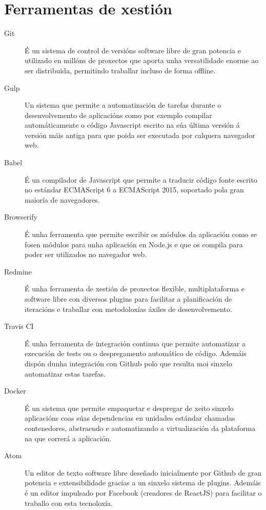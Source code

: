   \section{Ferramentas de xestión}

  \begin{description}
   \item [Git] É un sistema de control de versións software libre de gran 
potencia e 
utilizado en millóns de proxectos que aporta unha versatilidade enorme ao ser 
distribuida, permitindo traballar incluso de forma offline.
   \item [Gulp] Un sistema que permite a automatización de tarefas durante o 
desenvolvemento de aplicacións como por exemplo compilar automáticamente o código 
Javascript escrito na súa última versión á versión máis antiga para que poida ser 
executada por calquera navegador web.
    \item [Babel] É un compilador de Javascript que permite a traducir código 
fonte escrito no estándar ECMAScript 6 a ECMAScript 2015, soportado pola gran 
maioría de navegadores.
    \item [Browserify] É unha ferramenta que permite escribir os módulos da 
aplicación como se fosen módulos para unha aplicación en Node.js e que os 
compila para poder ser utilizados no navegador web. 
   \item [Redmine] É unha ferramenta de xestión de proxectos flexible, multiplataforma e 
software libre con diversos plugins para facilitar a planificación de iteracións e 
traballar con metodoloxías áxiles de desenvolvemento.
   \item [Travis CI] É unha ferramenta de integración continua que permite automatizar a 
execución de tests ou o despregamento automático de código. Ademáis dispón dunha 
integración con Github polo que resulta moi sinxelo automatizar estas tarefas.
   \item [Docker] É un sistema que permite empaquetar e despregar de xeito 
sinxelo aplicacións coas súas dependencias en unidades estándar chamadas 
contenedores, abstraendo e automatizando a virtualización da plataforma na que 
correrá a aplicación.
   \item [Atom] Un editor de texto software libre deseñado inicialmente por Github de 
gran potencia e extensibilidade gracias a un sinxelo sistema de plugins. Ademáis é un 
editor impulsado por Facebook (creadores de ReactJS) para facilitar o traballo con esta 
tecnoloxía.

  \end{description}

